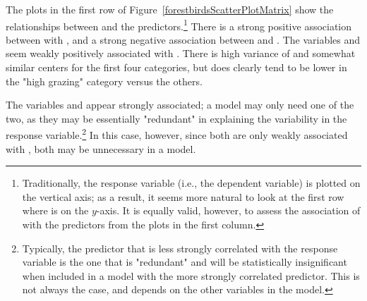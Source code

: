 The plots in the first row of Figure~\ref{forestbirdsScatterPlotMatrix} show the relationships between  and the predictors.\footnote{Traditionally, the response variable (i.e., the dependent variable) is plotted on the vertical axis; as a result, it seems more natural to look at the first row where  is on the $y$-axis. It is equally valid, however, to assess the association of  with the predictors from the plots in the first column.} There is a strong positive association between  with , and a strong negative association between  and . The variables  and  seem weakly positively associated with . There is high variance of  and somewhat similar centers for the first four categories, but  does clearly tend to be lower in the "high grazing" category versus the others.

The variables  and  appear strongly associated; a model may only need one of the two, as they may be essentially "redundant" in explaining the variability in the response variable.\footnote{Typically, the predictor that is less strongly correlated with the response variable is the one that is "redundant" and will be statistically insignificant when included in a model with the more strongly correlated predictor. This is not always the case, and depends on the other variables in the model.} In this case, however, since both are only weakly associated with , both may be unnecessary in a model.

    
